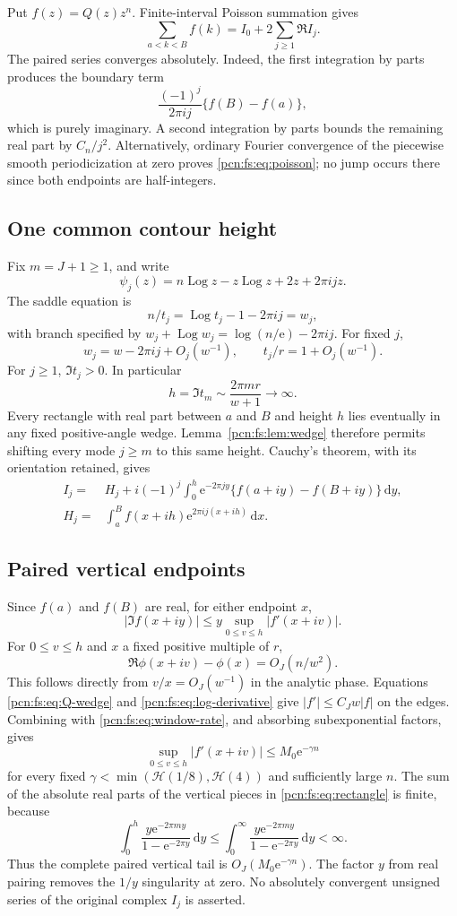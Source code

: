 \documentclass[11pt,letterpaper]{article}
\theoremstyle{remark}\newtheorem{remark}[theorem]{Remark}
\newcommand{\dd}{\,\mathrm d}
\newcommand{\ee}{\mathrm e}
\newcommand{\Log}{\operatorname{Log}}
\begin{document}
Put $f(z)=Q(z)z^n$. Finite-interval Poisson summation gives
\begin{equation}\label{pcn:fs:eq:poisson}
 \sum_{a<k<B}f(k)=I_0+2\sum_{j\ge1}\Re I_j.
\end{equation}
The paired series converges absolutely. Indeed, the first integration by parts produces the boundary term
\[
 \frac{(-1)^j}{2\pi i j}\{f(B)-f(a)\},
\]
which is purely imaginary. A second integration by parts bounds the remaining real part by $C_n/j^2$. Alternatively, ordinary Fourier convergence of the piecewise smooth periodicization at zero proves \eqref{pcn:fs:eq:poisson}; no jump occurs there since both endpoints are half-integers.

\subsection{One common contour height}
Fix $m=J+1\ge1$, and write
\[
 \psi_j(z)=n\Log z-z\Log z+2z+2\pi ijz.
\]
The saddle equation is
\[
 n/t_j=\Log t_j-1-2\pi ij=w_j,
\]
with branch specified by $w_j+\Log w_j=\log(n/\ee)-2\pi ij$. For fixed $j$,
\[
 w_j=w-2\pi ij+O_j(w^{-1}),\qquad
 t_j/r=1+O_j(w^{-1}).
\]
For $j\ge1$, $\Im t_j>0$. In particular
\[
 h=\Im t_m\sim\frac{2\pi m r}{w+1}\longrightarrow\infty.
\]
Every rectangle with real part between $a$ and $B$ and height $h$ lies eventually in any fixed positive-angle wedge. Lemma~\ref{pcn:fs:lem:wedge} therefore permits shifting every mode $j\ge m$ to this same height. Cauchy's theorem, with its orientation retained, gives
\begin{align}
 I_j={}&H_j+i(-1)^j\int_0^h\ee^{-2\pi jy}
                    \{f(a+iy)-f(B+iy)\}\dd y,\label{pcn:fs:eq:rectangle}\\
 H_j={}&\int_a^B f(x+ih)\ee^{2\pi ij(x+ih)}\dd x.\nonumber
\end{align}

\subsection{Paired vertical endpoints}
Since $f(a)$ and $f(B)$ are real, for either endpoint $x$,
\[
 |\Im f(x+iy)|\le y\sup_{0\le v\le h}|f'(x+iv)|.
\]
For $0\le v\le h$ and $x$ a fixed positive multiple of $r$,
\[
 \Re\phi(x+iv)-\phi(x)=O_J(n/w^2).
\]
This follows directly from $v/x=O_J(w^{-1})$ in the analytic phase. Equations \eqref{pcn:fs:eq:Q-wedge} and \eqref{pcn:fs:eq:log-derivative} give $|f'|\le C_Jw|f|$ on the edges. Combining with \eqref{pcn:fs:eq:window-rate}, and absorbing subexponential factors, gives
\[
 \sup_{0\le v\le h}|f'(x+iv)|\le M_0\ee^{-\gamma n}
\]
for every fixed $\gamma<\min(\mathcal H(1/8),\mathcal H(4))$ and sufficiently large $n$.
The sum of the absolute real parts of the vertical pieces in \eqref{pcn:fs:eq:rectangle} is finite, because
\begin{equation}\label{pcn:fs:eq:kernel}
 \int_0^h\frac{y\ee^{-2\pi my}}{1-\ee^{-2\pi y}}\dd y
 \le\int_0^\infty\frac{y\ee^{-2\pi my}}{1-\ee^{-2\pi y}}\dd y
 <\infty.
\end{equation}
Thus the complete paired vertical tail is $O_J(M_0\ee^{-\gamma n})$. The factor $y$ from real pairing removes the $1/y$ singularity at zero. No absolutely convergent unsigned series of the original complex $I_j$ is asserted.
\end{document}
